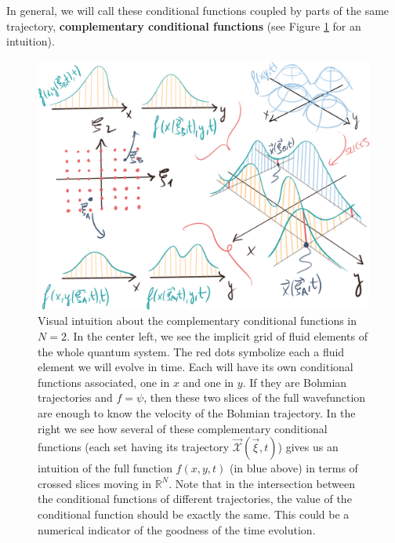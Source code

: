 \documentclass[11pt, a4paper]{article} %
\newcommand{\R}{\mathbb{R}} %
\newcommand{\x}{\mathcal{X}}
\begin{document}
In general, we will call these conditional functions coupled by parts of the same trajectory, {\bf complementary conditional functions} (see Figure \ref{fig:complementary} for an intuition).
\vspace{0.3cm}

\begin{figure}[h!]
  \centering
    \includegraphics[width=0.75\linewidth]{7slices_complementary.png}
  \caption{ Visual intuition about the complementary conditional functions in $N=2$. In the center left, we see the implicit grid of fluid elements of the whole quantum system. The red dots symbolize each a fluid element we will evolve in time. Each will have its own conditional functions associated, one in $x$ and one in $y$. If they are Bohmian trajectories and $f=\psi$, then these two slices of the full wavefunction are enough to know the velocity of the Bohmian trajectory. In the right we see how several of these complementary conditional functions (each set having its trajectory $\vec{\x}(\vec{\xi},t)$) gives us an intuition of the full function $f(x,y,t)$ (in blue above) in terms of crossed slices moving in $\R^N$. Note that in the intersection between the conditional functions of different trajectories, the value of the conditional function should be exactly the same. This could be a numerical indicator of the goodness of the time evolution. }
  \label{fig:complementary}
\end{figure}
\end{document}
